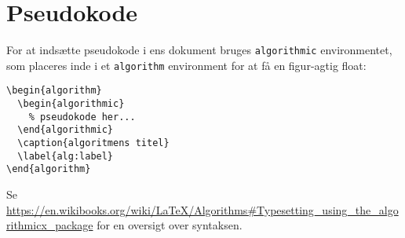 
\chapter{Pseudokode}
\label{app:pseudocode}

For at indsætte pseudokode i ens dokument bruges \texttt{algorithmic} environmentet, som placeres inde i et \texttt{algorithm} environment for at få en figur-agtig float:
%
\begin{verbatim}
\begin{algorithm}
  \begin{algorithmic}
    % pseudokode her...
  \end{algorithmic}
  \caption{algoritmens titel}
  \label{alg:label}
\end{algorithm}
\end{verbatim}



Se \url{https://en.wikibooks.org/wiki/LaTeX/Algorithms#Typesetting_using_the_algorithmicx_package} for en oversigt over syntaksen.